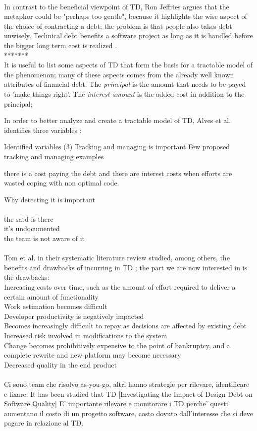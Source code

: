 \\
In contrast to the beneficial viewpoint of TD, Ron Jeffries argues that the metaphor could be "perhaps too gentle", because it highlights the wise aspect of the choice of contracting a debt; the problem is that people also takes debt unwisely.
Technical debt benefits a software project as long as it is handled before the bigger long term cost is realized \cite{guo2016exploring}.
\\*******
\\
It is useful to list some aspects of TD that form the basis for a tractable model of the phenomenon; many of these aspects comes from the already well known attributes of financial debt. The \emph{principal} is the amount that needs to be payed to 'make things right'. The \emph{interest amount} is the added cost in addition to the principal;  

In order to better analyze and create a tractable model of TD, Alves et al. identifies three variables \cite{martini2018technical}: 


Identified variables (3)
Tracking and managing is important
Few proposed tracking and managing examples

there is a cost paying the debt and there are interest costs when efforts are wasted coping with non optimal code.



Why detecting it is important\\
\\
the satd is there
\\
it’s undocumented
\\
the team is not aware of it
\\
\\
Tom et al. in their systematic literature review studied, among others, the benefits and drawbacks of incurring in TD \cite{tom2012consolidated}; the part we are now interested in is the drawbacks: 
\\
Increasing costs over time, such as the amount of effort required to deliver a certain amount of functionality 
\\
Work estimation becomes difficult
\\
Developer productivity is negatively impacted 
\\
Becomes increasingly difficult to repay as decisions are affected by existing debt 
\\
Increased risk involved in modifications to the system
\\
Change becomes prohibitively expensive to the point of bankruptcy, and a complete rewrite
and new platform may become necessary
\\
Decreased quality in the end product
\\
\\
Ci sono team che risolvo as-you-go, altri hanno strategie per rilevare, identificare e fixare.
It has been studied that TD [Investigating the Impact of Design Debt on Software Quality]
E' importante rilevare e monitorare i TD perche' questi aumentano il costo di un progetto software, costo dovuto dall'interesse che si deve pagare in relazione al TD.

